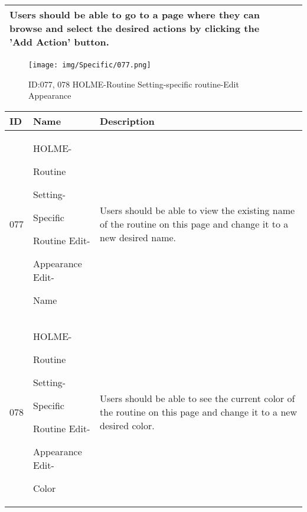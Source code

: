 \documentclass[conference]{IEEEtran}
\begin{document}
\begin{enumerate}
\begin{table}[h]
\begin{tabular}{|p{1cm}|p{1.8cm}|p{5.0cm}|}
Users should be able to go to a page where they can browse and select the desired actions by clicking the 'Add Action' button.\\ \hline
    \end{tabular}
\end{table}
\clearpage

\begin{figure}[h]
\centering                                         
\texttt{[image: img/Specific/077.png]}
\caption{ID:077, 078 HOLME-Routine Setting-specific routine-Edit Appearance}
\end{figure}
\begin{table}[h]
\def\arraystretch{1.2} \small
    \begin{tabular}{|p{1cm}|p{1.8cm}|p{5.0cm}|}
        \hline
        ID & Name & Description\\ \hline
         077  \par  & HOLME-\par Routine \par Setting- \par Specific  \par Routine Edit- \par Appearance Edit- \par Name & 
         Users should be able to view the existing name of the routine on this page and change it to a new desired name.
         \\ \hline
         078  \par  & HOLME-\par Routine \par Setting- \par Specific  \par Routine Edit- \par Appearance Edit- \par Color & 
        Users should be able to see the current color of the routine on this page and change it to a new desired color.
         \\ \hline
    \end{tabular}
\end{table}


\end{enumerate}
\end{document}
